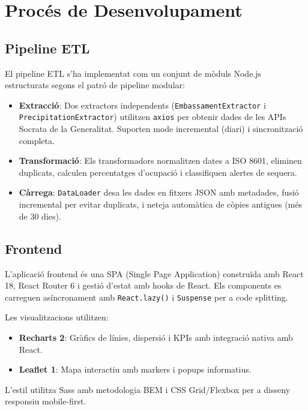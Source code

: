 \documentclass[11pt, a4paper]{article}
\begin{document}
\section{Procés de Desenvolupament}

\subsection{Pipeline ETL}

El pipeline ETL s'ha implementat com un conjunt de mòduls Node.js estructurats segons el patró de pipeline modular:

\begin{itemize}[leftmargin=*]
    \item \textbf{Extracció}: Dos extractors independents (\texttt{EmbassamentExtractor} i \texttt{PrecipitationExtractor}) utilitzen \texttt{axios} per obtenir dades de les APIs Socrata de la Generalitat. Suporten mode incremental (diari) i sincronització completa.
    \item \textbf{Transformació}: Els transformadors normalitzen dates a ISO 8601, eliminen duplicats, calculen percentatges d'ocupació i classifiquen alertes de sequera.
    \item \textbf{Càrrega}: \texttt{DataLoader} desa les dades en fitxers JSON amb metadades, fusió incremental per evitar duplicats, i neteja automàtica de còpies antigues (més de 30 dies).
\end{itemize}

\subsection{Frontend}

L'aplicació frontend és una SPA (Single Page Application) construïda amb React 18, React Router 6 i gestió d'estat amb hooks de React. Els components es carreguen asíncronament amb \texttt{React.lazy()} i \texttt{Suspense} per a code splitting.

Les visualitzacions utilitzen:
\begin{itemize}[leftmargin=*]
    \item \textbf{Recharts 2}: Gràfics de línies, dispersió i KPIs amb integració nativa amb React.
    \item \textbf{Leaflet 1}: Mapa interactiu amb markers i popups informatius.
\end{itemize}

L'estil utilitza Sass amb metodologia BEM i CSS Grid/Flexbox per a disseny responsiu mobile-first.
\end{document}

